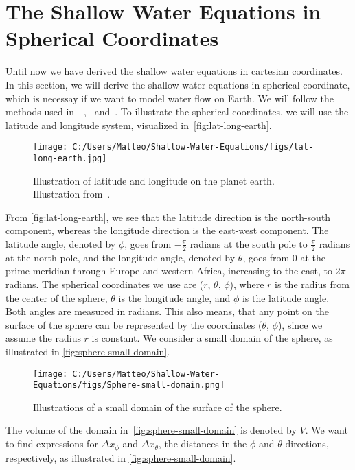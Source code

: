 \section{The Shallow Water Equations in Spherical Coordinates}
Until now we have derived the shallow water equations in cartesian coordinates.
In this section, we will derive the shallow water equations in spherical coordinate, which is necessay if we want to model water flow on Earth.
We will follow the methods used in~\cite{Castro2017}~\cite{Bihlo2022},~\cite{Raymond} and~\cite{Gill_1982}.
To illustrate the spherical coordinates, we will use the latitude and longitude system, visualized in~\autoref{fig:lat-long-earth}.
\begin{figure}[H]
    \centering
    \texttt{[image: C:/Users/Matteo/Shallow-Water-Equations/figs/lat-long-earth.jpg]}
    \caption{Illustration of latitude and longitude on the planet earth.
    Illustration from~\cite{lat-long-earth}.}\label{fig:lat-long-earth}
\end{figure}
From \autoref{fig:lat-long-earth}, we see that the latitude direction is the north-south component, whereas the longitude direction is the east-west component.
The latitude angle, denoted by $\phi$, goes from $-\frac{\pi}{2}$ radians at the south pole to $\frac{\pi}{2}$ radians at the north pole, and the longitude angle, denoted by $\theta$, goes from $0$ at the prime meridian through Europe and western Africa, increasing to the east, to $2\pi$ radians.
The spherical coordinates we use are ($r$, $\theta$, $\phi$), where $r$ is the radius from the center of the sphere, $\theta$ is the longitude angle, and $\phi$ is the latitude angle. Both angles are measured in radians.
This also means, that any point on the surface of the sphere can be represented by the coordinates ($\theta$, $\phi$), since we assume the radius $r$ is constant.
We consider a small domain of the sphere, as illustrated in \autoref{fig:sphere-small-domain}.
\begin{figure}[H]
    \centering
    \texttt{[image: C:/Users/Matteo/Shallow-Water-Equations/figs/Sphere-small-domain.png]}
    \caption{Illustrations of a small domain of the surface of the sphere.}\label{fig:sphere-small-domain}
\end{figure}
The volume of the domain in~\autoref{fig:sphere-small-domain} is denoted by $V$.
We want to find expressions for $\Delta x_{\phi}$ and $\Delta x_{\theta}$, the distances in the $\phi$ and $\theta$ directions, respectively, as illustrated in \autoref{fig:sphere-small-domain}.
